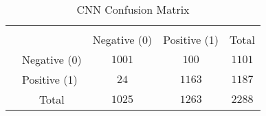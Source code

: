 {
\begin{table}[h!]
\centering
\begin{tabular}{l|l|c|c|c}
\multicolumn{2}{c}{}&\multicolumn{2}{c}{}&\\
\cline{3-4}
\multicolumn{2}{c|}{}&Negative (0)&Positive (1)&\multicolumn{1}{c}{Total}\\
\cline{2-4}
\multirow{}{}{}& Negative (0) & $1001$ & $100$ & $1101$\\
\cline{2-4}
& Positive (1) & $24$ & $1163$ & $1187$\\
\cline{2-4}
\multicolumn{1}{c}{} & \multicolumn{1}{c}{Total} & \multicolumn{1}{c}{$1025$} & \multicolumn{    1}{c}{$1263$} & \multicolumn{1}{c}{$2288$}\\
\end{tabular}
\caption{CNN Confusion Matrix}
\label{table:1}
\end{table}
}